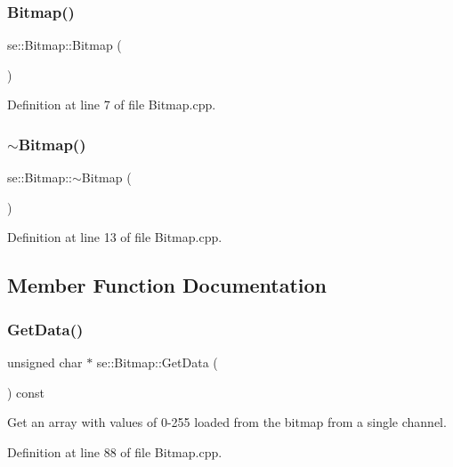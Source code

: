 \subsubsection{\texorpdfstring{Bitmap()}{Bitmap()}}
{\footnotesize\ttfamily se\+::\+Bitmap\+::\+Bitmap (\begin{DoxyParamCaption}{ }\end{DoxyParamCaption})}



Definition at line 7 of file Bitmap.\+cpp.

\mbox{\label{classse_1_1_bitmap_aa098fcae7998e75240e46594fe84996e}} 
\subsubsection{\texorpdfstring{$\sim$\+Bitmap()}{~Bitmap()}}
{\footnotesize\ttfamily se\+::\+Bitmap\+::$\sim$\+Bitmap (\begin{DoxyParamCaption}{ }\end{DoxyParamCaption})}



Definition at line 13 of file Bitmap.\+cpp.



\subsection{Member Function Documentation}
\mbox{\label{classse_1_1_bitmap_ac3746b0776fcdee3dfcd1cf51f2ceb4b}} 
\subsubsection{\texorpdfstring{Get\+Data()}{GetData()}}
{\footnotesize\ttfamily unsigned char $\ast$ se\+::\+Bitmap\+::\+Get\+Data (\begin{DoxyParamCaption}{ }\end{DoxyParamCaption}) const}

Get an array with values of 0-\/255 loaded from the bitmap from a single channel. 

Definition at line 88 of file Bitmap.\+cpp.

\mbox{\label{classse_1_1_bitmap_a805f18948c75eaad1985520814514c1e}} 
